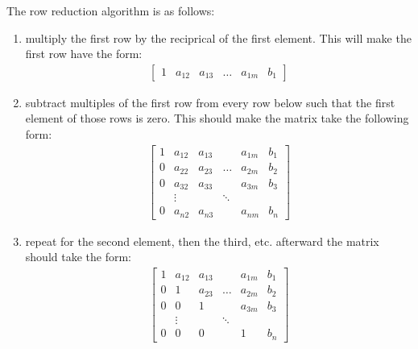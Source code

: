 \documentclass{article}
\theoremstyle{mytheoremstyle}
\theoremstyle{mytheoremstyle}
\theoremstyle{myproblemstyle}
\begin{document}
    The row reduction algorithm is as follows:
    \begin{enumerate}
        \item multiply the first row by the reciprical of the first element.
        This will make the first row have the form:
        \begin{align*}
            \begin{bmatrix}
                1 & a_{12} & a_{13} & \ldots & a_{1m} & b_1
            \end{bmatrix}
        \end{align*}

        \item subtract multiples of the first row from every row below such that
        the first element of those rows is zero. This should make the matrix
        take the following form:
        \begin{align*}
            \begin{bmatrix}
                1 & a_{12} & a_{13} &        & a_{1m} & b_1 \\
                0 & a_{22} & a_{23} & \ldots & a_{2m} & b_2 \\
                0 & a_{32} & a_{33} &        & a_{3m} & b_3 \\
                  & \vdots &        & \ddots &        &     \\
                0 & a_{n2} & a_{n3} &        & a_{nm} & b_n
            \end{bmatrix}
        \end{align*}

        \item repeat for the second element, then the third, etc. afterward the
        matrix should take the form:
        \begin{align*}
            \begin{bmatrix}
                1 & a_{12} & a_{13} &        & a_{1m} & b_1 \\
                0 & 1      & a_{23} & \ldots & a_{2m} & b_2 \\
                0 & 0      & 1      &        & a_{3m} & b_3 \\
                  & \vdots &        & \ddots &        &     \\
                0 & 0      & 0      &        & 1      & b_n
            \end{bmatrix}
        \end{align*}


\end{enumerate}
\end{document}
